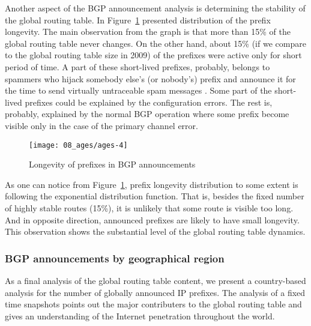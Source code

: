 Another aspect of the BGP announcement analysis is determining the stability
of the global routing table. In Figure~\ref{fig:bgp ages} presented
distribution of the prefix longevity. The main observation from the graph is
that more than 15\% of the global routing table never changes. On the other
hand, about 15\% (if we compare to the global routing table size in 2009) of
the prefixes were active only for short period of time. A part of these
short-lived prefixes, probably, belongs to spammers who hijack somebody else's
(or nobody's) prefix and announce it for the time to send virtually
untraceable spam messages
\cite{Ramachandran:2006:Understanding-the-network-level}. Some part of the
short-lived prefixes could be explained by the configuration errors. The rest
is, probably, explained by the normal BGP operation where some prefix become
visible only in the case of the primary channel error.

\begin{figure}[htbp]
	\centering
		\texttt{[image: 08\_ages/ages-4]}
	\caption{Longevity of prefixes in BGP announcements}
	\label{fig:bgp ages}
\end{figure}

As one can notice from Figure~\ref{fig:bgp ages}, prefix longevity
distribution to some extent is following the exponential distribution
function. That is, besides the fixed number of highly stable routes (15\%), it
is unlikely that some route is visible too long. And in opposite direction,
announced prefixes are likely to have small longevity. This observation shows
the substantial level of the global routing table dynamics.

\subsubsection{BGP announcements by geographical region}

As a final analysis of the global routing table content, we present a country-based analysis for the number of globally announced IP prefixes. The analysis of a fixed time snapshots points out the major contributers to the global routing table and gives an understanding of the Internet penetration throughout the world. 

